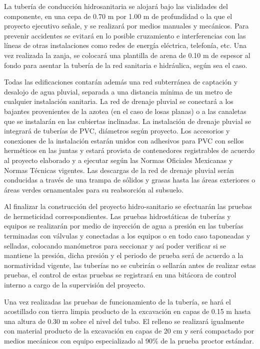 \documentclass{article}
\begin{document}
\bigskip

La tubería de conducción hidrosanitaria se alojará bajo las vialidades del componente, en una cepa de 0.70 m por 1.00 m de profundidad o la que el proyecto ejecutivo señale, y se realizará por medios manuales y mecánicos. Para prevenir accidentes se evitará en lo posible cruzamiento e interferencias con las líneas de otras instalaciones como redes de energía eléctrica, telefonía, etc. Una vez realizada la zanja, se colocará una plantilla de arena de 0.10 m de espesor al fondo para asentar la tubería de la red sanitaria e hidráulica, según sea el caso. 


\bigskip

Todas las edificaciones contarán además una red subterránea de captación y desalojo de agua pluvial, separada a una distancia mínima de un metro de cualquier instalación sanitaria. La red de drenaje pluvial se conectará a los bajantes provenientes de la azotea (en el caso de losas planas) o a las canaletas que se instalarán en las cubiertas inclinadas. La instalación de drenaje pluvial se integrará de tuberías de PVC, diámetros según proyecto. Los accesorios y conexiones de la instalación estarán unidos con adhesivos para PVC con sellos herméticos en las juntas y estará provista de contenedores registrables de acuerdo al proyecto elaborado y a ejecutar según las Normas Oficiales Mexicanas y Normas Técnicas vigentes. Las descargas de la red de drenaje pluvial serán conducidas a través de una trampa de sólidos y grasas hasta las áreas exteriores o áreas verdes ornamentales para su reabsorción al subsuelo.


\bigskip

Al finalizar la construcción del proyecto hidro-sanitario se efectuarán las pruebas de hermeticidad correspondientes. Las pruebas hidrostáticas de tuberías y equipos se realizarán por medio de inyección de agua a presión en las tuberías terminadas con válvulas y conectadas a los equipos o en todo caso taponeadas y selladas, colocando manómetros para seccionar y así poder verificar si se mantiene la presión, dicha presión y el periodo de prueba será de acuerdo a la normatividad vigente, las tuberías no se cubrirán o sellarán antes de realizar estas pruebas, el control de estas pruebas se registrará en una bitácora de control interno a cargo de la supervisión del proyecto. 


\bigskip

Una vez realizadas las pruebas de funcionamiento de la tubería, se hará el acostillado con tierra limpia producto de la excavación en capas de 0.15 m hasta una altura de 0.30 m sobre el nivel del tubo. El relleno se realizará igualmente con material producto de la excavación en capas de 20 cm y será compactado por medios mecánicos con equipo especializado al 90\% de la prueba proctor estándar.
\end{document}
